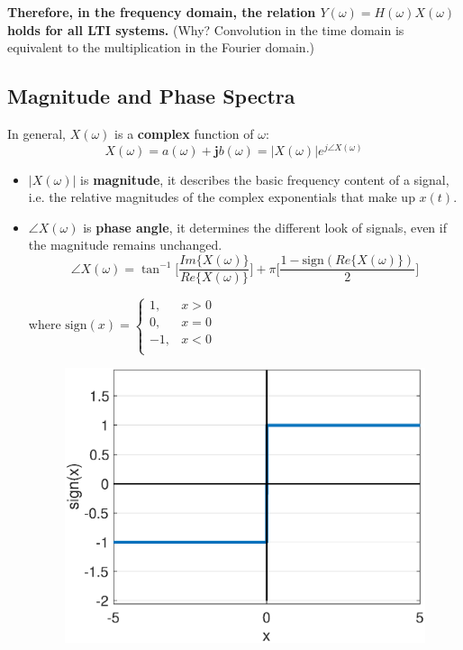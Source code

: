 \textbf{Therefore, in the frequency domain, the relation $Y(\omega) =  H(\omega)  X(\omega)$ holds for all LTI systems.} (Why? Convolution in the time domain is equivalent to the multiplication in the Fourier domain.)

\subsection{Magnitude and Phase Spectra}
In general, $X(\omega)$ is a \textbf{complex} function of $\omega$:
\[ X(\omega)= a(\omega)+\mathbf{j}b(\omega) = \lvert X(\omega) \rvert e^{j\angle X(\omega)}\]
\begin{itemize}
    \item $\lvert X(\omega) \rvert$ is \textbf{magnitude}, it describes the basic frequency content of a signal, i.e.  the relative magnitudes of the complex exponentials that make up $x(t)$.
    
    \item $\angle X(\omega)$ is \textbf{phase angle}, it  determines the different look of signals, even if the magnitude remains unchanged.
    \[ 
    \angle X(\omega) = \tan^{-1} \bigg[\frac{Im\{X(\omega)\}}{Re\{X(\omega)\}}\bigg]+\pi \bigg[ \frac{1-\mathrm{sign}(Re\{X(\omega)\})}{2} \bigg] 
    \]
    \begin{minipage}{0.4\textwidth}
    where $\mathrm{sign}(x)=\begin{cases}
    1, & x>0\\
    0, & x=0\\
    -1, & x<0\\
    \end{cases}$
    \end{minipage}
    \begin{minipage}{0.4\textwidth}
        \begin{figure}[H] 
            \centering
            \includegraphics[width=\textwidth]{images/sign.eps}
        \end{figure}
    \end{minipage}
\end{itemize}

